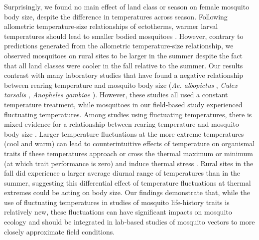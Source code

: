 \documentclass[doublespacing, linenumbers]{bmcart}
\begin{document}
Surprisingly, we found no main effect of land class or season on female mosquito body size, despite the difference in temperatures across season.
Following allometric temperature-size relationships of ectotherms, warmer larval temperatures should lead to smaller bodied mosquitoes \cite{angilleta2004}.
However, contrary to predictions generated from the allometric temperature-size relationship, we observed mosquitoes on rural sites to be larger in the summer despite the fact that all land classes were cooler in the fall relative to the summer.
Our results contrast with many laboratory studies that have found a negative relationship between rearing temperature and mosquito body size (\textit{Ae. albopictus} \cite{reiskind2012a}, \textit{Culex tarsalis} \cite{dodson2012}, \textit{Anopheles gambiae} \cite{koella1996}).
However, these studies all used a constant temperature treatment, while mosquitoes in our field-based study experienced fluctuating temperatures.
Among studies using fluctuating temperatures, there is mixed evidence for a relationship between rearing temperature and mosquito body size \cite{murdock2017, mohammed2011}.
Larger temperature fluctuations at the more extreme temperatures (cool and warm) can lead to counterintuitive effects of temperature on organismal traits if these temperatures approach or cross the thermal maximum or minimum (at which trait performance is zero) and induce thermal stress \cite{carrington2013, colinet2015}.
Rural sites in the fall did experience a larger average diurnal range of temperatures than in the summer, suggesting this differential effect of temperature fluctuations at thermal extremes could be acting on body size.
Our findings demonstrate that, while the use of fluctuating temperatures in studies of mosquito life-history traits is relatively new, these fluctuations can have significant impacts on mosquito ecology and should be integrated in lab-based studies of mosquito vectors to more closely approximate field conditions.
\end{document}
